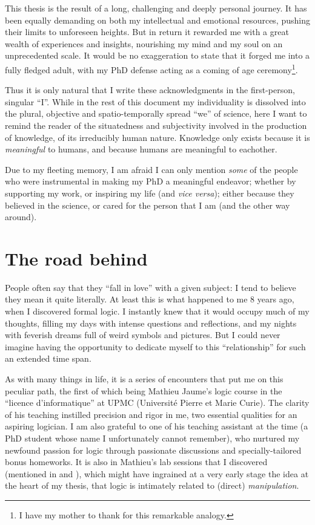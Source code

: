 
This thesis is the result of a long, challenging and deeply personal journey. It has been equally demanding on both my intellectual and emotional resources, pushing their limits to unforeseen heights. But in return it rewarded me with a great wealth of experiences and insights, nourishing my mind and my soul on an unprecedented scale. It would be no exaggeration to state that it forged me into a fully fledged adult, with my PhD defense acting as a coming of age ceremony\footnote{I have my mother to thank for this remarkable analogy.}.

Thus it is only natural that I write these acknowledgments in the first-person, singular ``I''. While in the rest of this document my individuality is dissolved into the plural, objective and spatio-temporally spread ``we'' of science, here I want to remind the reader of the situatedness and subjectivity involved in the production of knowledge, of its irreducibly human nature. Knowledge only exists because it is \emph{meaningful} to humans, and because humans are meaningful to eachother.

Due to my fleeting memory, I am afraid I can only mention \emph{some} of the people who were instrumental in making my PhD a meaningful endeavor; whether by supporting my work, or inspiring my life (and \textit{vice versa}); either because they believed in the science, or cared for the person that I am (and the other way around).

\section*{The road behind}

People often say that they ``fall in love'' with a given subject: I tend to believe they mean it quite literally. At least this is what happened to me 8 years ago, when I discovered formal logic. I instantly knew that it would occupy much of my thoughts, filling my days with intense questions and reflections, and my nights with feverish dreams full of weird symbols and pictures. But I could never imagine having the opportunity to dedicate myself to this ``relationship'' for such an extended time span.

As with many things in life, it is a series of encounters that put me on this peculiar path, the first of which being Mathieu Jaume's logic course in the ``licence d'informatique'' at UPMC (Université Pierre et Marie Curie). The clarity of his teaching instilled precision and rigor in me, two essential qualities for an aspiring logician. I am also grateful to one of his teaching assistant at the time (a PhD student whose name I unfortunately cannot remember), who nurtured my newfound passion for logic through passionate discussions and specially-tailored bonus homeworks. It is also in Mathieu's lab sessions that I discovered  (mentioned in  and ), which might have ingrained at a very early stage the idea at the heart of my thesis, that logic is intimately related to (direct) \emph{manipulation}.

